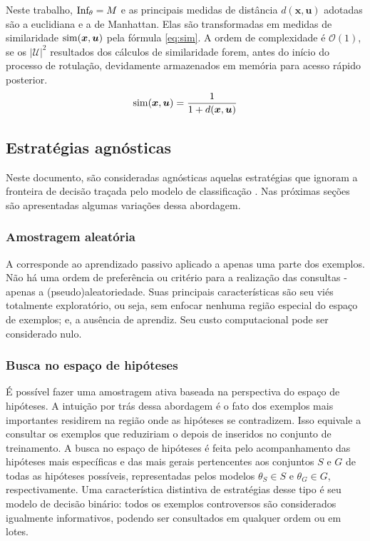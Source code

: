 Neste trabalho, $\operatorname*{Inf_\theta} = M$ e as principais medidas de distância $d(\bm{x},\bm{u})$ adotadas são a euclidiana e a de Manhattan.
Elas são transformadas em medidas de similaridade $\operatorname*{sim}(\bm{x},\bm{u})$ pela fórmula \ref{eq:sim}.
A ordem de complexidade é $\mathcal{O}(1)$, se os $|\mathcal{U}|^2$ resultados dos cálculos de similaridade forem, antes do início do processo de rotulação, devidamente armazenados em memória para acesso rápido posterior.
\begin{equation}\label{eq:sim}
 \operatorname*{sim}(\bm{x},\bm{u}) = \frac{1}{1 + d(\bm{x},\bm{u})}
\end{equation}


\subsection{Estratégias agnósticas}\label{estag}
Neste documento, são consideradas agnósticas aquelas estratégias que ignoram a fronteira de decisão traçada pelo modelo de classificação \cite{journals/ml/KearnsSS94}. 
Nas próximas seções são apresentadas algumas variações dessa abordagem.

\subsubsection{Amostragem aleatória}
A \textit{} corresponde ao aprendizado passivo aplicado a apenas uma parte dos exemplos.
Não há uma ordem de preferência ou critério para a realização das consultas - apenas a (pseudo)aleatoriedade.
Suas principais características são seu viés totalmente exploratório, ou seja, sem enfocar nenhuma região especial do espaço de exemplos; e, a ausência de aprendiz.
Seu custo computacional pode ser considerado nulo.

\subsubsection{Busca no espaço de hipóteses}\label{sgnet}
É possível fazer uma amostragem ativa baseada na perspectiva do espaço de hipóteses.
A intuição por trás dessa abordagem é o fato dos exemplos mais importantes residirem na região onde as hipóteses se contradizem.
Isso equivale a consultar os exemplos que reduziriam o \versionspace 
depois de inseridos no conjunto de treinamento.
A busca no espaço de hipóteses é feita pelo acompanhamento das hipóteses
mais específicas e das mais gerais pertencentes aos conjuntos $S$ e $G$
de todas as hipóteses possíveis, representadas pelos modelos $\theta_S \in S$ e $\theta_G \in G$, respectivamente.
Uma característica distintiva de estratégias desse tipo é seu modelo de decisão binário: todos os exemplos controversos são considerados igualmente informativos, podendo ser consultados em qualquer ordem ou em lotes.

